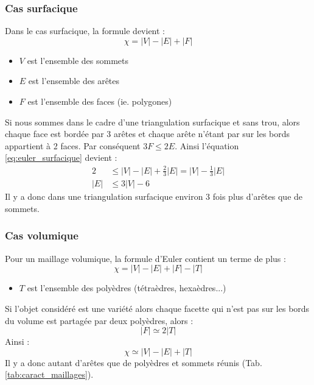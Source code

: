 \subsubsection{Cas surfacique}
\label{combi_2d}
\noindent
Dans le cas surfacique, la formule devient :
\begin{equation}
\label{eq:euler_surfacique}
\chi = |V|-|E|+|F|
\end{equation}
\begin{itemize}
\item $V$ est l'ensemble des sommets
\item $E$ est l'ensemble des arêtes
\item $F$ est l'ensemble des faces (ie. polygones)\\
\end{itemize}
Si nous sommes dans le cadre d'une triangulation surfacique et sans trou, alors chaque face est bordée par 3 arêtes et chaque arête n'étant par sur les bords appartient à 2 faces. Par conséquent $3F\leqslant 2E$. Ainsi l'équation \ref{eq:euler_surfacique} devient :\\
\begin{align*}
2 &\leqslant |V| - |E| + \frac{2}{3}|E| = |V| - \frac{1}{3}|E|\\
|E|&\leqslant 3|V|-6
\end{align*}
Il y a donc dans une triangulation surfacique environ 3 fois plus d'arêtes que de sommets.
\subsubsection{Cas volumique}
\noindent
Pour un maillage volumique, la formule d'Euler contient un terme de plus :\\
\begin{equation}
\chi = |V|-|E|+|F|-|T|
\end{equation}
\begin{itemize}
\item $T$ est l'ensemble des polyèdres (tétraèdres, hexaèdres...)\\
\end{itemize}
Si l'objet considéré est une variété alors chaque facette qui n'est pas sur les bords du volume est partagée par deux polyèdres, alors :\\
\begin{equation}
|F|\simeq 2|T|
\end{equation}
Ainsi :
\begin{equation}
\chi \simeq |V|-|E|+|T|
\end{equation}
Il y a donc autant d'arêtes que de polyèdres et sommets réunis (Tab. \ref{tab:caract_maillages}).

